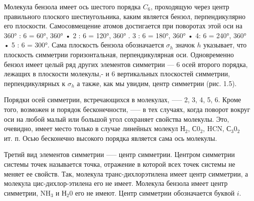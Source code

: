 Молекула бензола имеет ось шестого порядка $C_6$, проходящую через центр правильного 
плоского шестиугольника, каким является бензол, перпендикулярно его плоскости. 
Самосовмещение атомов достигается при поворотах этой оси на 360° : 6 = 60°, 360° • 2 : 6 = 120°, 360° . 3 : 6 = 180°, 360° • 4: 6 = 240°, 360° • 5 : 6 = 300°. Сама плоскость бензола обозначается $\sigma_h$ значок $h$ указывает, 
что плоскость симметрии горизонтальная, перпендикулярная оси. Одновременно бензол имеет целый ряд других 
элементов симметрии --- 6 осей второго порядка, лежащих в плоскости молекулы,- и 6 вертикальных
 плоскостей симметрии, перпендикулярных к $\sigma_h$ а также, как мы увидим, центр симметрии (рис. 1.5).

Порядки осей симметрии, встречающихся в молекулах, --— 2, 3, 4, 5, 6. Кроме того, возможен и порядок бесконечности, —-- в тех случаях, когда поворот вокруг оси на любой малый или большой угол сохраняет свойства молекулы. Это, очевидно, имеет место только в случае линейных молекул Н$_2$, С0$_2$, HCN, С$_3$0$_2$ ит. п. Осью бесконечно высокого порядка является сама ось молекулы.

Третий вид элементов симметрии —-- центр симметрии. Центром симметрии системы точек называется точка, отражение в которой всех точек системы не меняет ее свойств. Так, молекула транс-дихлорэтилена имеет центр симметрии, а молекула цис-дихлор-этилена его не имеет. Молекула бензола имеет центр симметрии, NH$_3$ и Н$_2$0 его не имеют. Центр симметрии обозначается буквой $i$.



